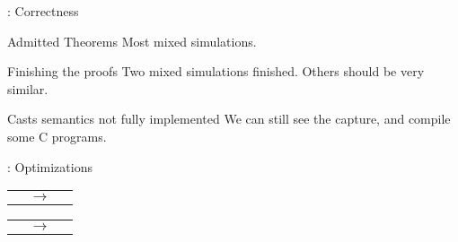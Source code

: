 \begin{frame}{\secname: Correctness}

  \begin{alertblock}{Admitted Theorems}
    Most mixed simulations.
  \end{alertblock}
  \vfill
  \begin{exampleblock}{Finishing the proofs}
    Two mixed simulations finished. Others should be very similar.
  \end{exampleblock}
  \vfill
  \begin{alertblock}{Casts semantics not fully implemented}
    We can still see the capture, and compile some C programs.
  \end{alertblock}
  
\end{frame}

\begin{frame}{\secname: Optimizations}
  \begin{tabular}{l c r}
     &
    $\longrightarrow$ &
    
  \end{tabular}
  \vfill
  \hrulefill
  \vfill
  \begin{tabular}{l c r}
     &
    $\longrightarrow$ & 
    
  \end{tabular}

\end{frame}
